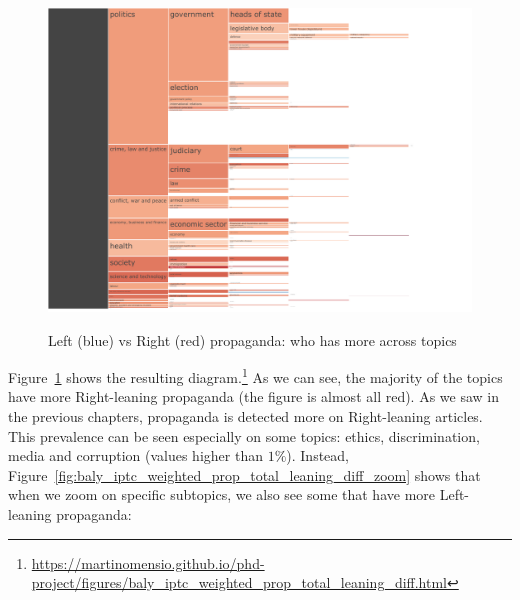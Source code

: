 \begin{figure}[!htbp]
    \centering
    \href{https://martinomensio.github.io/phd-project/figures/baly_iptc_weighted_prop_total_leaning_diff.html}{\includegraphics[trim={2.65cm 0cm 2.8cm 0cm},clip,width=\linewidth]{figures/baly_iptc_weighted_prop_total_leaning_diff.pdf}}
    \caption{Left (blue) vs Right (red) propaganda: who has more across topics}
    \label{fig:baly_iptc_weighted_prop_total_leaning_diff}
\end{figure}

Figure~\ref{fig:baly_iptc_weighted_prop_total_leaning_diff}
shows the resulting diagram.\footnote{\url{https://martinomensio.github.io/phd-project/figures/baly_iptc_weighted_prop_total_leaning_diff.html}}
As we can see, the majority of the topics have more Right-leaning propaganda (the figure is almost all red). As we saw in the previous chapters, propaganda is detected more on Right-leaning articles.
This prevalence can be seen especially on some topics: ethics, discrimination, media and corruption (values higher than $1\%$).
Instead, Figure~\ref{fig:baly_iptc_weighted_prop_total_leaning_diff_zoom} shows that when we zoom on specific subtopics, we also see some that have more Left-leaning propaganda:

